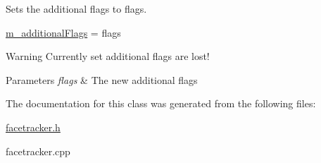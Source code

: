 Sets the additional flags to flags. 


\begin{DoxyCode}
\hyperlink{class_face_tracker_a20e60ee13a0d72915c5cd911fb551b25}{m\_additionalFlags} = flags 
\end{DoxyCode}
 \begin{DoxyWarning}{Warning}
Currently set additional flags are lost! 
\end{DoxyWarning}

\begin{DoxyParams}{Parameters}
{\em flags} & The new additional flags \\
\hline
\end{DoxyParams}


The documentation for this class was generated from the following files\-:\begin{DoxyCompactItemize}
\item 
\hyperlink{facetracker_8h}{facetracker.\-h}\item 
facetracker.\-cpp\end{DoxyCompactItemize}
